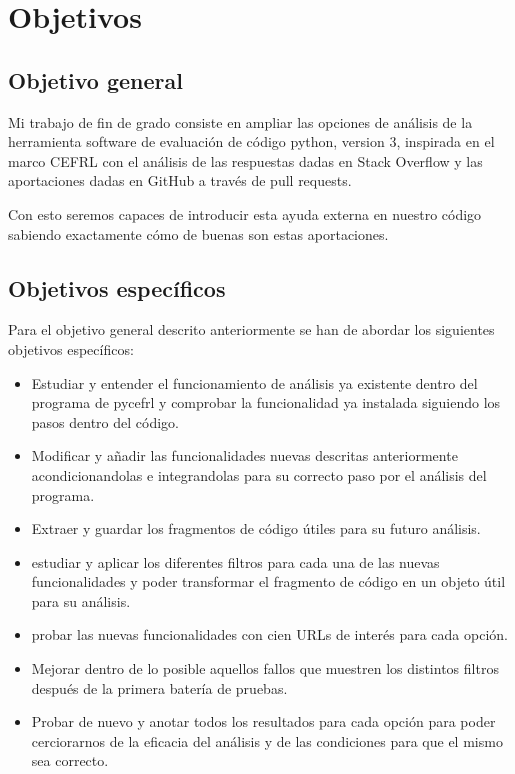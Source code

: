 \documentclass[a4paper, 12pt]{book}
\begin{document}

\cleardoublepage %
\chapter{Objetivos} %
\label{chap:objetivos} %

\section{Objetivo general} %
\label{sec:objetivo-general} %

Mi trabajo de fin de grado consiste en ampliar las opciones de análisis de la herramienta software de evaluación de código python, version 3, inspirada en el marco CEFRL con el análisis de las respuestas dadas en Stack Overflow y las aportaciones dadas en GitHub a través de pull requests. 

Con esto seremos capaces de introducir esta ayuda externa en nuestro código sabiendo exactamente cómo de buenas son estas aportaciones.


\section{Objetivos específicos}
\label{sec:objetivos-especificos}

Para el objetivo general descrito anteriormente se han de abordar los siguientes objetivos específicos:

\begin{itemize}
	\item Estudiar y entender el funcionamiento de análisis ya existente dentro del programa de pycefrl y comprobar la funcionalidad ya instalada siguiendo los pasos dentro del código.
	\item Modificar y añadir las funcionalidades nuevas descritas anteriormente acondicionandolas e integrandolas para su correcto paso por el análisis del programa.
	\item Extraer y guardar los fragmentos de código útiles para su futuro análisis.
	\item estudiar y aplicar los diferentes filtros para cada una de las nuevas funcionalidades y poder transformar el fragmento de código en un objeto útil para su análisis.
	\item probar las nuevas funcionalidades con cien URLs de interés para cada opción.
	\item Mejorar dentro de lo posible aquellos fallos que muestren los distintos filtros después de la primera batería de pruebas.
	\item Probar de nuevo y anotar todos los resultados para cada opción para poder cerciorarnos de la eficacia del análisis y de las condiciones para que el mismo sea correcto. 
\end{itemize}
\end{document}
